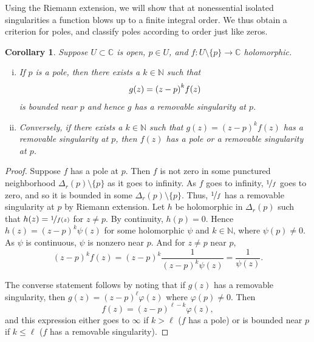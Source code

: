 \documentclass[12pt,openany]{book}
\newcommand{\avoidbreak}{\postdisplaypenalty=100}
\newcommand{\C}{{\mathbb{C}}}
\newcommand{\N}{{\mathbb{N}}}
\theoremstyle{plain}
\newtheorem{cor}[thm]{Corollary}
\theoremstyle{remark}
\theoremstyle{definition}
\theoremstyle{exercise}
\theoremstyle{example}
\begin{document}
Using the Riemann extension, we will show that
at nonessential isolated singularities
a function blows up to a finite integral order.
We thus obtain a criterion for poles, and classify
poles according to order just like zeros.

\begin{cor}
\pagebreak[2]
Suppose $U \subset \C$ is open, $p \in U$,
and $f \colon U \setminus \{p\} \to \C$ holomorphic.
\begin{enumerate}[(i)]
\item
If $p$ is a pole, then there exists a $k \in \N$ such that
\begin{equation*}
g(z) = {(z-p)}^k f(z)
\avoidbreak
\end{equation*}
is bounded near $p$ and hence $g$ has a removable singularity at $p$.
\item
Conversely, if there exists a $k \in \N$ such that
$g(z) = {(z-p)}^k f(z)$ has a removable singularity at $p$,
then $f(z)$ has a pole or a
removable singularity at $p$.
\end{enumerate}
\end{cor}

\begin{proof}
Suppose $f$ has a pole at $p$.
Then $f$ is not zero in some
punctured neighborhood $\Delta_r(p) \setminus \{p\}$ as it goes to infinity.
As $f$ goes to infinity,
$\nicefrac{1}{f}$ goes to zero, and so it is bounded in some $\Delta_r(p)
\setminus \{p\}$.
Thus, $\nicefrac{1}{f}$ has a removable singularity at $p$ by Riemann extension.
Let $h$ be holomorphic in $\Delta_r(p)$
such that $h(z) = \nicefrac{1}{f(z)}$ for $z \not= p$.  By continuity, $h(p) =
0$.  Hence $h(z) = {(z-p)}^k \psi(z)$ for some holomorphic $\psi$ and $k \in \N$,
where $\psi(p) \not= 0$.  As $\psi$ is continuous, $\psi$ is nonzero near $p$.
And for $z \not= p$ near $p$,
\begin{equation*}
{(z-p)}^k f(z)
=
{(z-p)}^k \frac{1}{{(z-p)}^k \psi(z)}
=
\frac{1}{\psi(z)} .
\end{equation*}

The converse statement follows by noting that if $g(z)$ has a removable
singularity, then $g(z) = {(z-p)}^\ell \varphi(z)$ where
$\varphi(p) \not= 0$.
Then
\begin{equation*}
f(z) = {(z-p)}^{\ell-k} \varphi(z) ,
\end{equation*}
and this expression either goes to $\infty$ if $k > \ell$ ($f$ has a pole) or is
bounded near $p$ if $k \leq \ell$ ($f$ has a removable singularity).
\end{proof}
\end{document}
